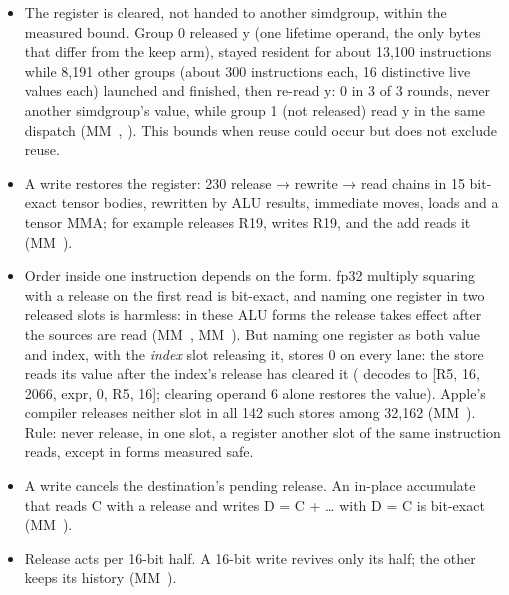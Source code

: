 \begin{itemize}
  In the partial arm only the lanes that executed the release lost y, and in the all-off arm none did: the release acts
  on each lane's copy, an instruction no lane executes releases nothing, and a simdgroup-wide free is ruled out. A
  compiler must therefore treat a value released inside a branch as dead only on the lanes that took the branch
  (\cref{sec:loops-loop-variable-rule}, rule 3).
\item The register is cleared, not handed to another simdgroup, within the measured bound. Group 0 released y (one
  lifetime operand, the only bytes that differ from the keep arm), stayed resident for about 13,100
  instructions while 8,191 other groups (about 300 instructions each, 16 distinctive live values each) launched and
  finished, then re-read y: 0 in 3 of 3 rounds, never another simdgroup's value, while group 1 (not released) read y in
  the same dispatch (MM~, ). This bounds when reuse could occur but
  does not exclude reuse.
\item A write restores the register: 230 release → rewrite → read chains in 15 bit-exact tensor bodies, rewritten by ALU results,
  immediate moves, loads and a tensor MMA; for example  releases R19,  writes R19,
  and the add reads it (MM~).
\item Order inside one instruction depends on the form. fp32 multiply squaring  with a release on the first read
  is bit-exact, and  naming one register in two released slots is harmless: in
  these ALU forms the release takes effect after the sources are read (MM~, MM~). But  naming one register as both value and index, with the \emph{index} slot releasing it, stores 0 on every lane: the
  store reads its value after the index's release has cleared it ( decodes to {[}R5, 16, 2066, expr,
  0, R5, 16{]}; clearing operand 6 alone restores the value). Apple's compiler releases neither slot in all 142 such
  stores among 32,162 (MM~). Rule: never release, in one slot, a register another slot of the same instruction
  reads, except in forms measured safe.
\item A write cancels the destination's pending release. An in-place accumulate that reads C with a release and writes
  D = C + \dots{} with D = C is bit-exact (MM~).
\item Release acts per 16-bit half. A 16-bit write revives only its half; the other keeps its history (MM~).
\end{itemize}

